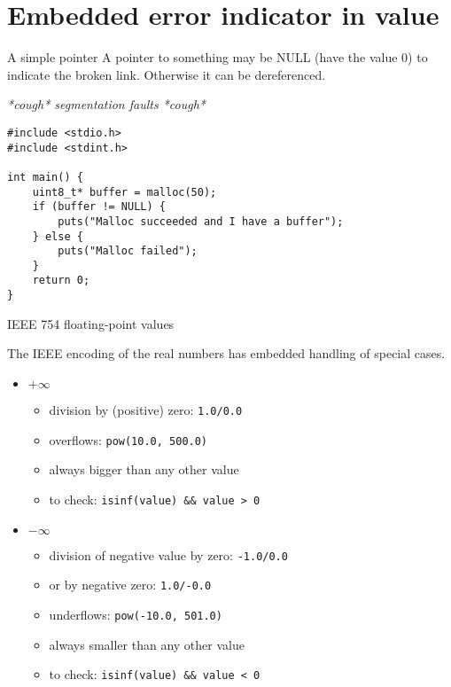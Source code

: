 \documentclass[aspectratio=169,14pt]{beamer}
\begin{document}
\section{Embedded error indicator in value}

\begin{frame}[fragile]{A simple pointer}
A pointer to something may be NULL (have the value 0) to indicate the broken link.
Otherwise it can be dereferenced.

\textit{*cough* segmentation faults *cough*}

\begin{lstlisting}[style=cstyle]
#include <stdio.h>
#include <stdint.h>

int main() {
    uint8_t* buffer = malloc(50);
    if (buffer != NULL) {
        puts("Malloc succeeded and I have a buffer");
    } else {
        puts("Malloc failed");
    }
    return 0;
}
\end{lstlisting}
\end{frame}

\begin{frame}{IEEE 754 floating-point values}

The IEEE encoding of the real numbers has embedded handling of special cases.

\begin{itemize}
    \item \( + \infty \)
    \begin{itemize}
        \item division by (positive) zero: \texttt{1.0/0.0}
        \item overflows: \texttt{pow(10.0, 500.0)}
        \item always bigger than any other value
        \item to check: \texttt{isinf(value) \&\& value > 0}
    \end{itemize}

    \item \( - \infty \)
    \begin{itemize}
        \item division of negative value by zero: \texttt{-1.0/0.0}
        \item or by negative zero: \texttt{1.0/-0.0}
        \item underflows: \texttt{pow(-10.0, 501.0)}
        \item always smaller than any other value
        \item to check: \texttt{isinf(value) \&\& value < 0}
    \end{itemize}
\end{itemize}
\end{frame}
\end{document}
